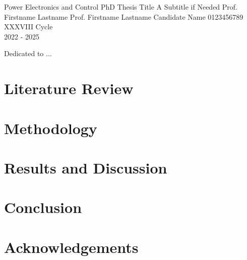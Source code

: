 \documentclass{pv_phd}
\begin{document}
\makefrontpage
  {Power Electronics and Control}      %
  {PhD Thesis Title}                   %
  {A Subtitle if Needed}               %
  {Prof. Firstname Lastname}           %
  {Prof. Firstname Lastname}           %
  {Candidate Name}                     %
  {0123456789}                         %
  {XXXVIII Cycle \\ 2022 - 2025}       %

\begin{dedication}

    Dedicated to ...

\end{dedication}

    \tableofcontents \clearpage \sloppy {} 



\chapter{Literature Review}
\blindtext[7] %

\chapter{Methodology}
\blindtext[5] %

\chapter{Results and Discussion}
\blindtext[7] %

\chapter{Conclusion}
\blindtext[3] %

\chapter*{Acknowledgements}
\thispagestyle{empty}
\blindtext[1] %

\clearpage


\clearpage
\listoffigures
{}

\clearpage
\listoftables
{}

\clearpage
\end{document}
